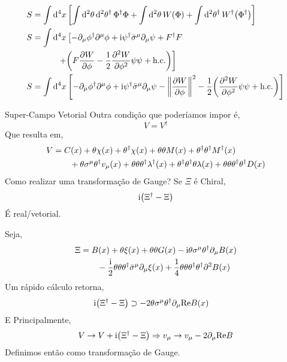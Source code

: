 \documentclass{beamer}
\begin{document}
\begin{frame}
    \begin{align*}
        S&=\int\dd[4]{x}\qty[\int\dd[2]{\theta}\dd[2]{\theta^\dagger}\Phi^\dagger\Phi+
        \int\dd[2]{\theta}W\qty(\Phi)+\int\dd[2]{\theta^\dagger}W^\dagger\qty(\Phi^\dagger)]\\
        S&=\int\dd[4]{x}\left[-\partial_\mu\phi^\dagger\partial^\mu\phi+\textnormal{i}\psi^\dagger{\bar\sigma}^\mu\partial_\mu\psi+F^\dagger F\right.\\
        &\quad\quad\quad\left.+\qty(F\pdv{W}{\phi}-\frac12\pdv[2]{W}{\phi}\psi\psi+\textnormal{h.c.})\right]\\
        S&=\int\dd[4]{x}\left[-\partial_\mu\phi^\dagger\partial^\mu\phi+\textnormal{i}\psi^\dagger{\bar\sigma}^\mu\partial_\mu\psi-\norm{\pdv{W}{\phi}}^2-\frac12\qty(\pdv[2]{W}{\phi}\psi\psi+\textnormal{h.c.})\right]
    \end{align*}
\end{frame}

\begin{frame}{Super-Campo Vetorial}
    Outra condição que poderíamos impor é,
    \[V=V^\dagger\]
    Que resulta em,
    \begin{align*}
        V&=C\qty(x)+\theta\chi\qty(x)+\theta^\dagger\chi\qty(x)+\theta\theta M\qty(x)+\theta^\dagger\theta^\dagger M^\dagger\qty(x)\\
        &\quad\quad+\theta\sigma^\mu\theta^\dagger v_\mu\qty(x)+\theta\theta\theta^\dagger\lambda^\dagger\qty(x)+\theta^\dagger\theta^\dagger\theta\lambda\qty(x)+\theta\theta\theta^\dagger\theta^\dagger D\qty(x)
    \end{align*}
    Como realizar uma transformação de Gauge? \pause Se $\Xi$ é Chiral,\[\textnormal{i}\qty(\Xi^\dagger-\Xi)\] É real/vetorial.
\end{frame}

\begin{frame}
    Seja,
    \begin{align*}
        \Xi&=B\qty(x)+\theta\xi\qty(x)+\theta\theta G\qty(x)-\textnormal{i}\theta\sigma^\mu\theta^\dagger\partial_\mu B\qty(x)\\
        &\quad\quad-\frac{\textnormal{i}}2\theta\theta\theta^\dagger{\bar\sigma}^\mu\partial_\mu\xi\qty(x)+\frac14\theta\theta\theta^\dagger\theta^\dagger\partial^2 B\qty(x)
    \end{align*}
    Um rápido cálculo retorna,
    \begin{align*}
        \textnormal{i}\qty(\Xi^\dagger-\Xi)&\supset-2\theta\sigma^\mu\theta^\dagger\partial_\mu\textnormal{Re}B\qty(x)
    \end{align*}
    E Principalmente,
    \[V\rightarrow V+\textnormal{i}\qty(\Xi^\dagger-\Xi)\Rightarrow v_\mu\rightarrow v_\mu -2\partial_\mu\textnormal{Re}B\]
    Definimos então como transformação de Gauge.
\end{frame}
\end{document}
